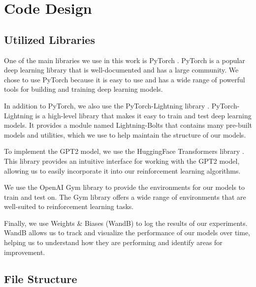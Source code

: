 \documentclass[conference]{IEEEtran}
\begin{document}
\section{Code Design}

\subsection{Utilized Libraries}


One of the main libraries we use in this work is PyTorch \cite{paszke2019pytorch}. PyTorch is a popular deep learning library that is well-documented and has a large community. We chose to use PyTorch because it is easy to use and has a wide range of powerful tools for building and training deep learning models.

In addition to PyTorch, we also use the PyTorch-Lightning library \cite{falcon2019pytorch}. PyTorch-Lightning is a high-level library that makes it easy to train and test deep learning models. It provides a module named Lightning-Bolts that contains many pre-built models and utilities, which we use to help maintain the structure of our models.

To implement the GPT2 model, we use the HuggingFace Transformers library \cite{wolf2019huggingface}. This library provides an intuitive interface for working with the GPT2 model, allowing us to easily incorporate it into our reinforcement learning algorithms.

We use the OpenAI Gym library \cite{brockman2016openai} to provide the environments for our models to train and test on. The Gym library offers a wide range of environments that are well-suited to reinforcement learning tasks.

Finally, we use Weights \& Biases (WandB) \cite{wandb} to log the results of our experiments. WandB allows us to track and visualize the performance of our models over time, helping us to understand how they are performing and identify areas for improvement.


\subsection{File Structure}
\end{document}
